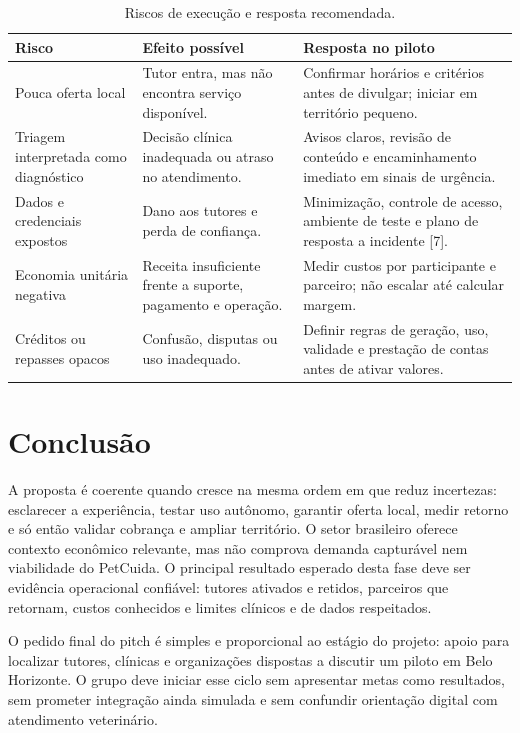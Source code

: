 \documentclass[12pt,a4paper]{article}
\begin{document}
\begin{table}[H]
\centering
\small
\caption{Riscos de execução e resposta recomendada.}
\begin{tabularx}{\textwidth}{P{3.2cm}YY}
\toprule
\textbf{Risco} & \textbf{Efeito possível} & \textbf{Resposta no piloto} \\
\midrule
Pouca oferta local & Tutor entra, mas não encontra serviço disponível. & Confirmar horários e critérios antes de divulgar; iniciar em território pequeno. \\
Triagem interpretada como diagnóstico & Decisão clínica inadequada ou atraso no atendimento. & Avisos claros, revisão de conteúdo e encaminhamento imediato em sinais de urgência. \\
Dados e credenciais expostos & Dano aos tutores e perda de confiança. & Minimização, controle de acesso, ambiente de teste e plano de resposta a incidente [7]. \\
Economia unitária negativa & Receita insuficiente frente a suporte, pagamento e operação. & Medir custos por participante e parceiro; não escalar até calcular margem. \\
Créditos ou repasses opacos & Confusão, disputas ou uso inadequado. & Definir regras de geração, uso, validade e prestação de contas antes de ativar valores. \\
\bottomrule
\end{tabularx}
\end{table}

\section{Conclusão}

A proposta é coerente quando cresce na mesma ordem em que reduz incertezas: esclarecer a experiência, testar uso autônomo, garantir oferta local, medir retorno e só então validar cobrança e ampliar território. O setor brasileiro oferece contexto econômico relevante, mas não comprova demanda capturável nem viabilidade do PetCuida. O principal resultado esperado desta fase deve ser evidência operacional confiável: tutores ativados e retidos, parceiros que retornam, custos conhecidos e limites clínicos e de dados respeitados.

O pedido final do pitch é simples e proporcional ao estágio do projeto: apoio para localizar tutores, clínicas e organizações dispostas a discutir um piloto em Belo Horizonte. O grupo deve iniciar esse ciclo sem apresentar metas como resultados, sem prometer integração ainda simulada e sem confundir orientação digital com atendimento veterinário.
\end{document}
